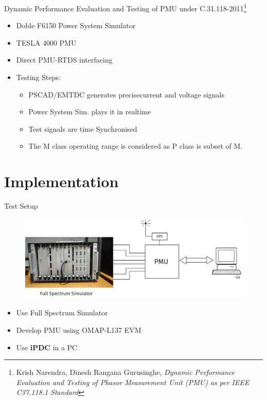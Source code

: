\documentclass{beamer}
\begin{document}
\begin{frame}{\small{Dynamic Performance Evaluation and Testing of PMU under C.31.118-2011}\footnote{\tiny Krish Narendra, Dinesh Rangana Gurusinghe, \textit{Dynamic Performance Evaluation and Testing of Phasor Measurement Unit (PMU) as per IEEE C37.118.1 Standard}}}
\begin{itemize}
\item Doble F6150 Power System Simulator
\item TESLA 4000 PMU
\item Direct PMU-RTDS interfacing
\item Testing Steps:
\begin{itemize}
	\item PSCAD/EMTDC generates precisecurrent and voltage signals
	\item Power System Sim. plays it in realtime
	\item Test signals are time Synchronised
	\item The M class operating range is considered as P class is subset of M. 
\end{itemize}
\end{itemize}
\end{frame}

\section{Implementation}
\begin{frame}{Test Setup}
\begin{figure}
\includegraphics[width=\textwidth]{Test_setup.png}
\end{figure}
\begin{itemize}
\item Use Full Spectrum Simulator 
\item Develop PMU using OMAP-L137 EVM
\item Use \textbf{iPDC} in a PC
\end{itemize}
\end{frame}
\end{document}
